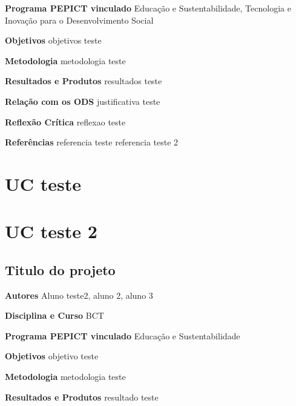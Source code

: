 \documentclass[12pt,openright,oneside,a4paper]{report}
\begin{document}
\vspace{0.7cm}
\noindent
\textbf{Programa PEPICT vinculado}
Educação e Sustentabilidade, Tecnologia e Inovação para o Desenvolvimento Social

\vspace{0.7cm}
\noindent
\textbf{Objetivos}
objetivos teste

\vspace{0.7cm}
\noindent
\textbf{Metodologia}
metodologia teste

\vspace{0.7cm}
\noindent
\textbf{Resultados e Produtos}
resultados teste

\vspace{0.7cm}
\noindent
\textbf{Relação com os ODS}
justificativa teste

\vspace{0.7cm}
\noindent
\textbf{Reflexão Crítica}
reflexao teste

\vspace{0.7cm}
\noindent
\textbf{Referências}
referencia teste
referencia teste 2

\vspace{0.7cm}
\chapter{UC teste}

\chapter{UC teste 2}

\section{Titulo do projeto}
\noindent
\textbf{Autores}
Aluno teste2, aluno 2, aluno 3

\vspace{0.7cm}
\noindent
\textbf{Disciplina e Curso}
BCT

\vspace{0.7cm}
\noindent
\textbf{Programa PEPICT vinculado}
Educação e Sustentabilidade

\vspace{0.7cm}
\noindent
\textbf{Objetivos}
objetivo teste

\vspace{0.7cm}
\noindent
\textbf{Metodologia}
metodologia teste

\vspace{0.7cm}
\noindent
\textbf{Resultados e Produtos}
resultado teste
\end{document}
